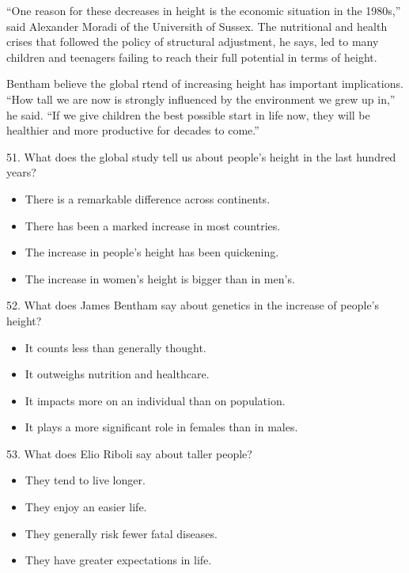 \documentclass[UTF8,11pt]{ctexart}
\begin{document}
“One reason for these decreases in height is the economic situation in the 1980s,” said Alexander Moradi of the Universith of Sussex. The nutritional and health crises that followed the policy of structural adjustment, he says, led to many children and teenagers failing to reach their full potential in terms of height.


Bentham believe the global rtend of increasing height has important implications. “How tall we are now is strongly influenced by the environment we grew up in,” he said. “If we give children the best possible start in life now, they will be healthier and more productive for decades to come.”


51. What does the global study tell us about people’s height in the last hundred years?


\begin{itemize}[leftmargin=2em,itemsep=.2em,topsep=.4em]\item[A.] There is a remarkable difference across continents.
\item[B.] There has been a marked increase in most countries.
\item[C.] The increase in people’s height has been quickening.
\item[D.] The increase in women’s height is bigger than in men’s.
\end{itemize}

52. What does James Bentham say about genetics in the increase of people’s height?


\begin{itemize}[leftmargin=2em,itemsep=.2em,topsep=.4em]\item[A.] It counts less than generally thought.
\end{itemize}

\begin{itemize}[leftmargin=2em,itemsep=.2em,topsep=.4em]\item[B.] It outweighs nutrition and healthcare.
\item[C.] It impacts more on an individual than on population.
\item[D.] It plays a more significant role in females than in males.
\end{itemize}

53. What does Elio Riboli say about taller people?


\begin{itemize}[leftmargin=2em,itemsep=.2em,topsep=.4em]\item[A.] They tend to live longer.
\item[B.] They enjoy an easier life.
\item[C.] They generally risk fewer fatal diseases.
\item[D.] They have greater expectations in life.
\end{itemize}
\end{document}
